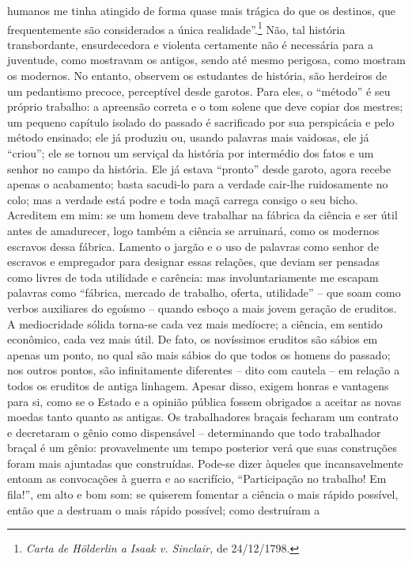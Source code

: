 humanos me tinha atingido de forma quase mais trágica do que os
destinos, que frequentemente são considerados a única
realidade''.\footnote{\emph{Carta de Hölderlin a Isaak v. Sinclair,} de 24/12/1798.}
Não, tal história transbordante, ensurdecedora e violenta certamente não
é necessária para a juventude, como mostravam os antigos, sendo até
mesmo perigosa, como mostram os modernos. No entanto, observem os
estudantes de história, são herdeiros de um pedantismo precoce,
perceptível desde garotos. Para eles, o ``método'' é seu próprio
trabalho: a apreensão correta e o tom solene que deve copiar dos
mestres; um pequeno capítulo isolado do passado é sacrificado por sua
perspicácia e pelo método ensinado; ele já produziu ou, usando palavras
mais vaidosas, ele já ``criou''; ele se tornou um serviçal da história
por intermédio dos fatos e um senhor no campo da história. Ele já estava
``pronto'' desde garoto, agora recebe apenas o acabamento; basta
sacudi-lo para a verdade cair-lhe ruidosamente no colo; mas a verdade
está podre e toda maçã carrega consigo o seu bicho. Acreditem em mim: se
um homem deve trabalhar na fábrica da ciência e ser útil antes de
amadurecer, logo também a ciência se arruinará, como os modernos
escravos dessa fábrica. Lamento o jargão e o uso de palavras como senhor
de escravos e empregador para designar essas relações, que deviam ser
pensadas como livres de toda utilidade e carência: mas involuntariamente
me escapam palavras como ``fábrica, mercado de trabalho, oferta,
utilidade'' -- que soam como verbos auxiliares do egoísmo -- quando
esboço a mais jovem geração de eruditos. A mediocridade sólida torna-se
cada vez mais medíocre; a ciência, em sentido econômico, cada vez mais
útil. De fato, os novíssimos eruditos são sábios em apenas um ponto, no
qual são mais sábios do que todos os homens do passado; nos outros
pontos, são infinitamente diferentes -- dito com cautela -- em relação a
todos os eruditos de antiga linhagem. Apesar disso, exigem honras e
vantagens para si, como se o Estado e a opinião pública fossem obrigados
a aceitar as novas moedas tanto quanto as antigas. Os trabalhadores
braçais fecharam um contrato e decretaram o gênio como dispensável --
determinando que todo trabalhador braçal é um gênio: provavelmente um
tempo posterior verá que suas construções foram mais ajuntadas que
construídas. Pode-se dizer àqueles que incansavelmente entoam as
convocações à guerra e ao sacrifício, ``Participação no trabalho! Em
fila!'', em alto e bom som: se quiserem fomentar a ciência o mais rápido
possível, então que a destruam o mais rápido possível; como destruíram a
